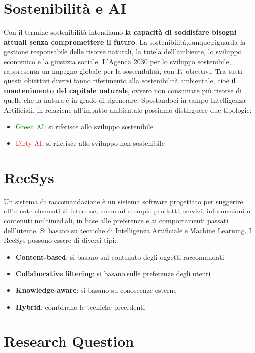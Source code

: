 \documentclass[12pt]{article}
\begin{document}

    \pagestyle{fancy}
    \everymath{\displaystyle}
    \sffamily
\section{Sostenibilità e AI}
Con il termine sostenibilità intendiamo \textbf{la capacità di soddisfare bisogni attuali senza compromettere il futuro}.
La sostenibilità,dunque,riguarda la gestione responsabile delle risorse naturali, la tutela dell'ambiente, lo sviluppo economico e la giustizia sociale. L'Agenda 2030 per lo sviluppo sostenibile, rappresenta un impegno globale per la sostenibilità, con 17 obiettivi.
Tra tutti questi obiettivi diversi fanno riferimento alla sostenibilità ambientale, cioè il     \textbf{mantenimento del capitale naturale}, ovvero non consumare più risorse di quelle che la natura è in grado di rigenerare. Spostandoci in campo Intelligenza Artificiali, in relazione all'impatto ambientale possiamo distinguere due tipologie:
\begin{itemize}
    \item \textcolor{green}{Green AI}: si riferisce allo sviluppo sostenibile
    \item \textcolor{red}{Dirty AI}: si riferisce allo sviluppo non sostenibile
\end{itemize}

\section{RecSys}
Un sistema di raccomandazione è un sistema software progettato per suggerire all’utente elementi di interesse, come ad esempio prodotti, servizi, informazioni o contenuti multimediali, in base alle preferenze e ai comportamenti passati dell’utente. Si basano su tecniche di Intelligenza Artificiale e Machine Learning. I RecSys possono essere di diversi tipi:
\begin{itemize}
    \item \textbf{Content-based}: si basano sul contenuto degli oggetti raccomandati
    \item \textbf{Collaborative filtering}: si basano sulle preferenze degli utenti
    \item \textbf{Knowledge-aware}: si basano su conoscenze esterne
    \item \textbf{Hybrid}: combinano le tecniche precedenti
\end{itemize}

\section{Research Question}
\end{document}
